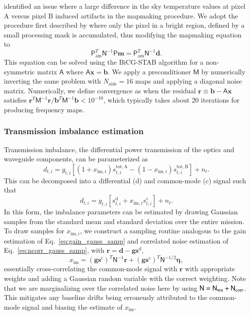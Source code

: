 \documentclass[twocolumn]{../../common/aa}
\newcommand{\N}[0]{\tens{N}}
\begin{document}
\citet{jarosik2010} identified an issue where a large difference in the sky temperature values at pixel A versus pixel B induced artifacts in the mapmaking procedure. We adopt the procedure first described by \citet{hinshaw2003a} where only the pixel in a bright region, defined by a small processing mask \citep{bennett2012} is accumulated, thus modifying the mapmaking equation to
\begin{equation}
	\mathsf P^T_\mathrm{am}\mathsf N^{-1}\mathsf P\boldsymbol m
	=\mathsf P^T_\mathrm{am}\mathsf N^{-1}\boldsymbol d.
\end{equation}
This equation can be solved using the BiCG-STAB algorithm for a non-symmetric matrix $\mathsf A$ where $\mathsf A\boldsymbol x=\boldsymbol b$. We apply a preconditioner $\mathsf M$ by numerically inverting the same problem with $N_\mathrm{side}=16$ maps and applying a diagonal noise matrix. Numerically, we define convergence as when the residual $\boldsymbol r\equiv\boldsymbol b-\mathsf A\boldsymbol x$ satisfies $\boldsymbol r^T\mathsf M^{-1}\boldsymbol r/\boldsymbol b^T\mathsf M^{-1}\boldsymbol b<10^{-10}$, which typically takes about 20 iterations for producing frequency maps.


\subsubsection{Transmission imbalance estimation}
\label{ssec:imbalance}


Transmission imbalance, the differential power transmission of the optics and waveguide components, can be parameterized as
\begin{equation}
	d_{t,i}=g_{t,i}[(1+x_{\mathrm{im},i})s_{t,i}^\mathrm{tot,A}-(1-x_{\mathrm{im},i})s_{t,i}^\mathrm{tot,B}]+n_t.
\end{equation}
This can be decomposed into a differential (d) and common-mode (c) signal such that
\begin{equation}
	d_{t,i}=g_{t,i}[s_{t,i}^\mathrm d+x_{\mathrm{im},i}s_{t,i}^\mathrm c]+n_t.
\end{equation}
In this form, the imbalance parameters can be estimated by drawing Gaussian samples from the standard mean and standard deviation over the entire mission. To draw samples for $x_{\mathrm{im},i}$, we construct a sampling routine analogous to the gain estimation of Eq.~\eqref{eq:gain_gauss_samp} and correlated noise estimation of  Eq.~\eqref{eq:ncorr_gauss_samp}, with $\boldsymbol r=\boldsymbol d-\boldsymbol g\boldsymbol s^\mathrm d$,
\begin{equation}
	[(\boldsymbol g\boldsymbol s^\mathrm c)^T\mathsf N^{-1}\boldsymbol g\boldsymbol s^\mathrm c]x_\mathrm{im}
	=(\boldsymbol g\boldsymbol s^\mathrm c)^T\mathsf N^{-1}\boldsymbol r+(\boldsymbol g\boldsymbol s^\mathrm c)^T\mathsf N^{-1/2}\boldsymbol\eta,
\end{equation}
essentially cross-correlating the common-mode signal with $\boldsymbol r$ with appropriate weights and adding a Gaussian random variable with the correct weighting. Note that we are marginalizing over the correlated noise here by using $\N=\N_\mathrm{wn}+\N_\mathrm{corr}$. This mitigates any baseline drifts being erroneusly attributed to the common-mode signal and biasing the estimate of $x_\mathrm{im}$.
\end{document}
